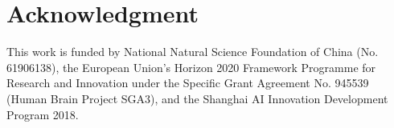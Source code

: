 \documentclass[journal,comsoc]{IEEEtran}
\begin{document}
\section*{Acknowledgment}
\par This work is funded by National Natural Science Foundation of China (No. 61906138), the European Union’s Horizon 2020 Framework Programme for Research and Innovation under the Specific Grant Agreement No. 945539 (Human Brain Project SGA3), and the Shanghai AI Innovation Development Program 2018.

\ifCLASSOPTIONcaptionsoff
  \newpage
\fi







\end{document}
